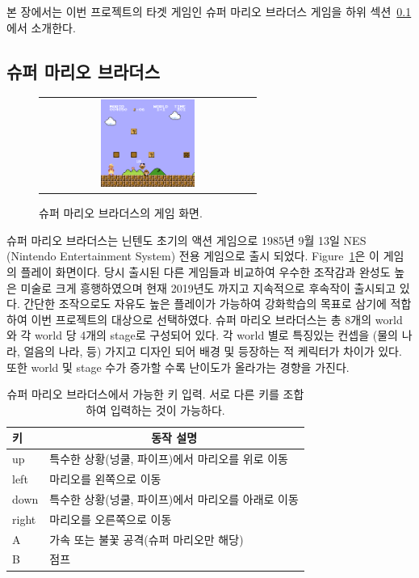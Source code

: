 본 장에서는 이번 프로젝트의 타겟 게임인 슈퍼 마리오 브라더스 게임을 하위 섹션~\ref{sec:method:smb}에서 소개한다.

\subsection{슈퍼 마리오 브라더스}
\label{sec:method:smb}

\begin{figure}[h]
\begin{center}
\begin{tabular}{c}
     \includegraphics[width=0.45\textwidth]{FIG/SuperMarioBros.png} \\
\end{tabular}
\caption{
	슈퍼 마리오 브라더스의 게임 화면.
}
\label{fig:mario_title}
\end{center}
\end{figure}

슈퍼 마리오 브라더스는 닌텐도 초기의 액션 게임으로 1985년 9월 13일 NES (Nintendo Entertainment System) 전용 게임으로 출시 되었다.
Figure~\ref{fig:mario_title}은 이 게임의 플레이 화면이다.
당시 출시된 다른 게임들과 비교하여 우수한 조작감과 완성도 높은 미술로 크게 흥행하였으며 현재 2019년도 까지고 지속적으로 후속작이 출시되고 있다.
간단한 조작으로도 자유도 높은 플레이가 가능하여 강화학습의 목표로 삼기에 적합하여 이번 프로젝트의 대상으로 선택하였다.
슈퍼 마리오 브라더스는 총 8개의 world 와 각 world 당 4개의 stage로 구성되어 있다.
각 world 별로 특징있는 컨셉을 (물의 나라, 얼음의 나라, 등) 가지고 디자인 되어 배경 및 등장하는 적 케릭터가 차이가 있다.
또한 world 및 stage 수가 증가할 수록 난이도가 올라가는 경향을 가진다.

\begin{table}[h]
\centering
	\caption {
		슈퍼 마리오 브라더스에서 가능한 키 입력. 서로 다른 키를 조합하여 입력하는 것이 가능하다.
	}
	\label{tab:mario:key}
\begin{tabular}{ll}
\toprule
키     & \multicolumn{1}{c}{동작 설명} \\
\midrule
up    & 특수한 상황(넝쿨, 파이프)에서 마리오를 위로 이동 \\
left  & 마리오를 왼쪽으로 이동 \\
down  & 특수한 상황(넝쿨, 파이프)에서 마리오를 아래로 이동 \\
right & 마리오를 오른쪽으로 이동 \\
A     & 가속 또는 불꽃 공격(슈퍼 마리오만 해당)\\
B     & 점프 \\
\bottomrule
\end{tabular}
\end{table}

